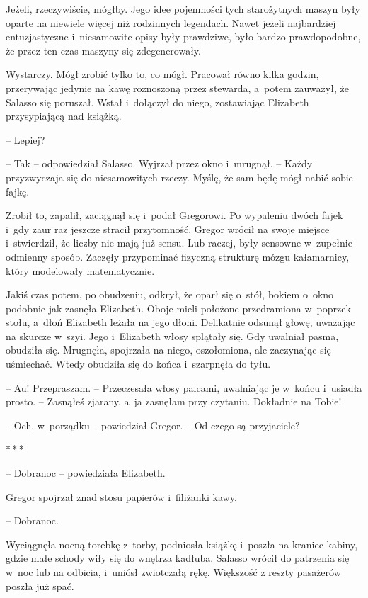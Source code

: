 \documentclass[oneside,polish,12pt,sfheadings]{mwbk}
\newcommand{\threeast}{\bigskip\par\centerline{*\,*\,*}\medskip\par}%
\begin{document}
Jeżeli, rzeczywiście, mógłby. Jego idee pojemności tych starożytnych
maszyn były oparte na niewiele więcej niż rodzinnych legendach. Nawet
jeżeli najbardziej entuzjastyczne i~niesamowite opisy były prawdziwe,
było bardzo prawdopodobne, że przez ten czas maszyny się zdegenerowały.

Wystarczy. Mógł zrobić tylko to, co mógł. Pracował równo kilka godzin,
przerywając jedynie na kawę roznoszoną przez stewarda, a~potem zauważył,
że Salasso się poruszał. Wstał i~dołączył do niego, zostawiając
Elizabeth przysypiającą nad książką.

-- Lepiej?

-- Tak -- odpowiedział Salasso. Wyjrzał przez okno i~mrugnął. -- Każdy
przyzwyczaja się do niesamowitych rzeczy. Myślę, że sam będę mógł nabić
sobie fajkę.

Zrobił to, zapalił, zaciągnął się i~podał Gregorowi. Po wypaleniu dwóch
fajek i~gdy zaur raz jeszcze stracił przytomność, Gregor wrócił na swoje
miejsce i~stwierdził, że liczby nie mają już sensu. Lub raczej, były
sensowne w~zupełnie odmienny sposób. Zaczęły przypominać fizyczną
strukturę mózgu kałamarnicy, który modelowały matematycznie.

Jakiś czas potem, po obudzeniu, odkrył, że oparł się o~stół, bokiem o~okno podobnie jak zasnęła Elizabeth. Oboje mieli położone przedramiona w~poprzek stołu, a~dłoń Elizabeth leżała na jego dłoni. Delikatnie odsunął
głowę, uważając na skurcze w~szyi. Jego i~Elizabeth włosy splątały się.
Gdy uwalniał pasma, obudziła się. Mrugnęła, spojrzała na niego,
oszołomiona, ale zaczynając się uśmiechać. Wtedy obudziła się do końca i~szarpnęła do tyłu.

-- Au! Przepraszam. -- Przeczesała włosy palcami, uwalniając je w~końcu i~usiadła prosto. -- Zasnąłeś zjarany, a~ja zasnęłam przy czytaniu.
Dokładnie na Tobie!

-- Och, w~porządku -- powiedział Gregor. -- Od czego są przyjaciele?

\threeast

-- Dobranoc -- powiedziała Elizabeth.

Gregor spojrzał znad stosu papierów i~filiżanki kawy.

-- Dobranoc.

Wyciągnęła nocną torebkę z~torby, podniosła książkę i~poszła na kraniec
kabiny, gdzie małe schody wiły się do wnętrza kadłuba. Salasso wrócił do
patrzenia się w~noc lub na odbicia, i~uniósł zwiotczałą rękę. Większość
z reszty pasażerów poszła już spać.
\end{document}
